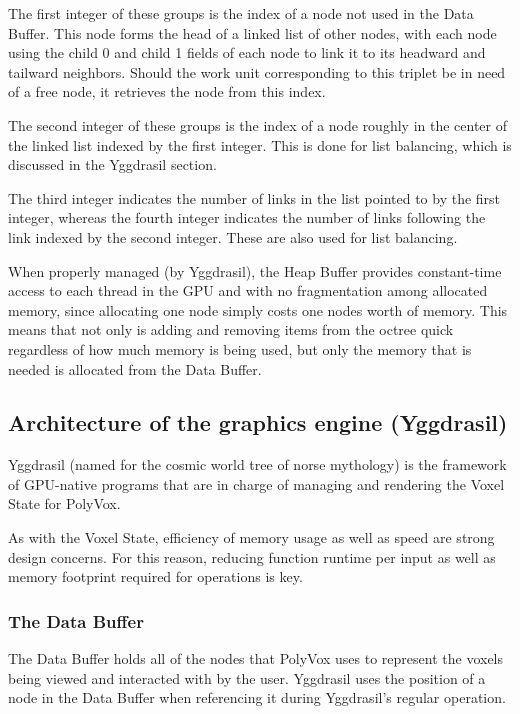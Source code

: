 \documentclass[onecolumn, draftclsnofoot,10pt, compsoc]{IEEEtran}
\begin{document}
The first integer of these groups is the index of a node not used in the Data Buffer. This node forms the head of a linked list of other nodes, with each node using the child 0 and child 1 fields of each node to link it to its headward and tailward neighbors. Should the work unit corresponding to this triplet be in need of a free node, it retrieves the node from this index.

The second integer of these groups is the index of a node roughly in the center of the linked list indexed by the first integer. This is done for list balancing, which is discussed in the Yggdrasil section.

The third integer indicates the number of links in the list pointed to by the first integer, whereas the fourth integer indicates the number of links following the link indexed by the second integer. These are also used for list balancing.

When properly managed (by Yggdrasil), the Heap Buffer provides constant-time access to each thread in the GPU and with no fragmentation among allocated memory, since allocating one node simply costs one nodes worth of memory. This means that not only is adding and removing items from the octree quick regardless of how much memory is being used, but only the memory that is needed is allocated from the Data Buffer.\\



\subsection{Architecture of the graphics engine (Yggdrasil)}

Yggdrasil (named for the cosmic world tree of norse mythology) is the framework of GPU-native programs that are in charge of managing and rendering the Voxel State for PolyVox.

As with the Voxel State, efficiency of memory usage as well as speed are strong design concerns. For this reason, reducing function runtime per input as well as memory footprint required for operations is key.\\
 

\subsubsection{The Data Buffer}

The Data Buffer holds all of the nodes that PolyVox uses to represent the voxels being viewed and interacted with by the user. Yggdrasil uses the position of a node in the Data Buffer when referencing it during Yggdrasil’s regular operation.\\~\\
\end{document}
